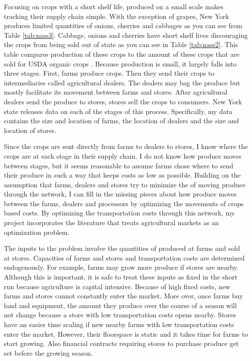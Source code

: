 \documentclass{report}
\begin{document}
Focusing on crops with a short shelf life, produced on a small scale makes tracking their supply chain simple. With the exception of grapes, New York produces limited quantities of onions, cherries and cabbages as you can see from Table \ref{tab:nass3}. Cabbage, onions and cherries have short shelf lives discouraging the crops from being sold out of state as you can see in Table \ref{tab:nass2}. This table compares production of these crops to the amount of these crops that are sold for USDA organic crops \cite{nass2}. Because production is small, it largely falls into three stages. First, farms produce crops. Then they send their crops to intermediaries called agricultural dealers. The dealers may bag the produce but mostly facilitate its movement between farms and stores. After agricultural dealers send the produce to stores, stores sell the crops to consumers. New York state releases data on each of the stages of this process. Specifically, my data contains the size and location of farms, the location of dealers and the size and location of stores. 

Since the crops are sent directly from farms to dealers to stores, I know where the crops are at each stage in their supply chain. I do not know how produce moves between stages, but it seems reasonable to assume farms chose where to send their produce in such a way that keeps costs as low as possible. Building on the assumption that farms, dealers and stores try to minimize the of moving produce through the network, I can fill in the missing pieces about how produce moves between the farms, dealers and processors by optimizing the movements of crops based costs. By optimizing the transportation costs through this network, my project incorporates the literature that treats agricultural markets as an optimization problem. 

The inputs to the problem involve the quantities of produced at farms and sold at stores. Capacities of farms and stores and transportation costs are determined endogenously. For example, farms may grow more produce if stores are nearby. Although this is important, it is safe to treat these inputs as fixed in the short run because agriculture is capital intensive. Because of high fixed costs, new farms and stores cannot constantly enter the market. More over, once farms buy land and equipment, the amount they produce over the course of a season will not change because a store with low transportation costs opens nearby. Stores have an easier time scaling if new nearby farms with low transportation costs enter the market. However, their floorspace is static and it takes time for farms to start growing. Also financial contracts requiring stores to purchase produce get set before the growing season.
\end{document}
